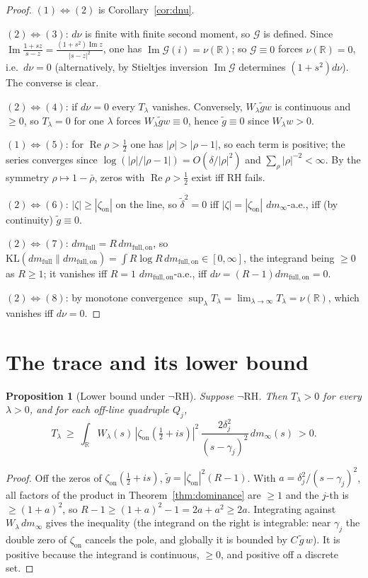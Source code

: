 \documentclass[11pt]{amsart}
\newtheorem{proposition}[theorem]{Proposition}
\theoremstyle{definition}
\theoremstyle{remark}
\newcommand{\RH}{\mathrm{RH}}
\renewcommand{\Re}{\operatorname{Re}}
\renewcommand{\Im}{\operatorname{Im}}
\newcommand{\half}{\tfrac12}
\newcommand{\dnu}{d\nu}
\newcommand{\dmfull}{dm_{\mathrm{full}}}
\newcommand{\dmon}{dm_{\mathrm{full,on}}}
\newcommand{\zon}{\zeta_{\mathrm{on}}}
\newcommand{\Tlam}{T_\lambda}
\newcommand{\Wlam}{W_\lambda}
\begin{document}
\begin{proof}
$(1)\Leftrightarrow(2)$ is Corollary~\ref{cor:dnu}.

$(2)\Leftrightarrow(3)$: $\dnu$ is finite with finite second moment, so $\mathcal G$ is defined.
Since $\Im\frac{1+sz}{s-z}=\frac{(1+s^2)\Im z}{|s-z|^2}$, one has $\Im\mathcal G(i)=\nu(\mathbb R)$;
so $\mathcal G\equiv0$ forces $\nu(\mathbb R)=0$, i.e.\ $\dnu=0$ (alternatively, by Stieltjes
inversion $\Im\mathcal G$ determines $(1+s^2)\dnu$). The converse is clear.

$(2)\Leftrightarrow(4)$: if $\dnu=0$ every $\Tlam$ vanishes. Conversely, $\Wlam\tilde g w$ is
continuous and $\ge0$, so $\Tlam=0$ for one $\lambda$ forces $\Wlam\tilde g w\equiv0$, hence
$\tilde g\equiv0$ since $\Wlam w>0$.

$(1)\Leftrightarrow(5)$: for $\Re\rho>\half$ one has $|\rho|>|\rho-1|$, so each term is
positive; the series converges since $\log(|\rho|/|\rho-1|)=O(\delta/|\rho|^2)$ and
$\sum_\rho|\rho|^{-2}<\infty$. By the symmetry $\rho\mapsto1-\bar\rho$, zeros with
$\Re\rho>\half$ exist iff $\RH$ fails.

$(2)\Leftrightarrow(6)$: $|\zeta|\ge|\zon|$ on the line, so $\widetilde\delta^2=0$ iff
$|\zeta|=|\zon|$ $dm_\infty$-a.e., iff (by continuity) $\tilde g\equiv0$.

$(2)\Leftrightarrow(7)$: $\dmfull=R\,\dmon$, so $\mathrm{KL}(\dmfull\|\dmon)=\int R\log R\,\dmon
\in[0,\infty]$, the integrand being $\ge0$ as $R\ge1$; it vanishes iff $R=1$ $\dmon$-a.e., iff
$\dnu=(R-1)\dmon=0$.

$(2)\Leftrightarrow(8)$: by monotone convergence $\sup_\lambda\Tlam=\lim_{\lambda\to\infty}\Tlam
=\nu(\mathbb R)$, which vanishes iff $\dnu=0$.
\end{proof}

\section{The trace and its lower bound}\label{sec:trace}

\begin{proposition}[Lower bound under $\neg\RH$]\label{prop:lower}
Suppose $\neg\RH$. Then $\Tlam>0$ for every $\lambda>0$, and for each off-line quadruple $Q_j$,
\[
\Tlam\ \ge\ \int_{\mathbb R}\Wlam(s)\,|\zon(\half+is)|^2\,
\frac{2\delta_j^2}{(s-\gamma_j)^2}\,dm_\infty(s)\ >0 .
\]
\end{proposition}
\begin{proof}
Off the zeros of $\zon(\half+is)$, $\tilde g=|\zon|^2(R-1)$. With $a=\delta_j^2/(s-\gamma_j)^2$,
all factors of the product in Theorem~\ref{thm:dominance} are $\ge1$ and the $j$-th is
$\ge(1+a)^2$, so $R-1\ge(1+a)^2-1=2a+a^2\ge2a$. Integrating against $\Wlam\,dm_\infty$ gives the
inequality (the integrand on the right is integrable: near $\gamma_j$ the double zero of $\zon$
cancels the pole, and globally it is bounded by $C\,\tilde g\,w$). It is positive because the
integrand is continuous, $\ge0$, and positive off a discrete set.
\end{proof}
\end{document}
